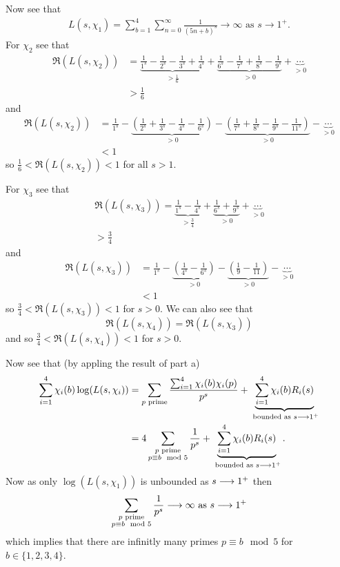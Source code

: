 \documentclass{unswmaths}
\begin{document}
Now see that 
\begin{align*}
	L(s,\chi_1) = \sum_{b = 1}^4 \sum_{n=0}^\infty \frac{1}{(5n+b)^s} \longrightarrow \infty \text{ as } s \longrightarrow 1^+.
\end{align*}
For $ \chi_2 $ see that 
\begin{align*}
	\Re(L(s, \chi_2)) &= \underbrace{\frac{1}{1^s} - \frac{1}{2^s} -\frac{1}{3^s} + \frac{1}{4^s}}_{>\frac{1}{6}} + \underbrace{\frac{1}{6^s} - \frac{1}{7^s} + \frac{1}{8^s} - \frac{1}{9^s}}_{> 0 } + \underbrace{\cdots}_{>0} \\
		&> \frac{1}{6}
\end{align*}
and 
\begin{align*}
	\Re(L(s, \chi_2)) &= \frac{1}{1^s} - \underbrace{\left( \frac{1}{2^s} +\frac{1}{3^s} - \frac{1}{4^s} - \frac{1}{6^s} \right)}_{>0} - 
		\underbrace{\left(\frac{1}{7^s} + \frac{1}{8^s} - \frac{1}{9^s} - \frac{1}{11^s} \right)}_{>0} - \underbrace{\cdots}_{>0} \\
		&< 1
\end{align*}
so $ \frac{1}{6} < \Re(L(s, \chi_2)) < 1 $ for all $ s > 1 $.

For $ \chi_3 $ see that
\begin{align*}
	\Re(L(s, \chi_3)) = \underbrace{\frac{1}{1^s} - \frac{1}{4^s}}_{>\frac{3}{4}} + 
		\underbrace{\frac{1}{6^s} + \frac{1}{9^s}}_{>0} + \underbrace{\cdots}_{>0} \\
		> \frac{3}{4}
\end{align*}
and 
\begin{align*}
	\Re(L(s, \chi_3)) &= \frac{1}{1^s} - \underbrace{\left( \frac{1}{4^s} - \frac{1}{6^s} \right)}_{>0} - \underbrace{\left( \frac{1}{9} - \frac{1}{11} \right)}_{>0} - \underbrace{\cdots}_{>0} \\
		&< 1
\end{align*}
so $ \frac{3}{4} < \Re(L(s, \chi_3)) < 1 $ for $ s > 0 $. 
We can also see that $$ \Re(L(s, \chi_4)) = \Re(L(s, \chi_3)) $$ and so $ \frac{3}{4} < \Re(L(s, \chi_4)) < 1 $ for $ s > 0 $.

Now see that (by appling the result of part a)
\begin{align*}
	\sum_{i=1}^4 \chi_i(b) \log( L(s, \chi_i)) &= \sum_{p \text{ prime}} \frac{\sum_{i=1}^{4}\chi_i(b)\chi_i(p)}{p^s} + \underbrace{\sum_{i=1}^4 \chi_i(b)R_i(s)}_{\text{ bounded as } s \longrightarrow 1^+}\\
		&= 4\sum_{\substack{p \text{ prime} \\ p \equiv b\mod 5 }} \frac{1}{p^s} + \underbrace{\sum_{i=1}^4 \chi_i(b)R_i(s)}_{\text{ bounded as } s \longrightarrow 1^+}.
\end{align*}
Now as only $ \log(L(s, \chi_1)) $ is unbounded as $ s \longrightarrow 1^+ $ then 
$$
\sum_{\substack{p \text{ prime} \\ p \equiv b\mod 5 }} \frac{1}{p^s} \longrightarrow \infty \text{ as } s \longrightarrow 1^+
$$
which implies that there are infinitly many primes $ p \equiv b \mod 5 $ for $ b \in \{ 1,2,3,4 \} $.
\end{document}
